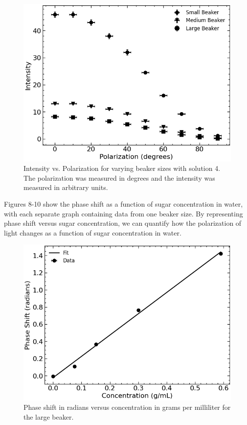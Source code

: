 \begin{figure}[H]
    \begin{center}
        \includegraphics[width=\columnwidth]{../figures/solution4.png}
    \end{center}
    \caption{Intensity vs. Polarization for varying beaker sizes with solution 4. The polarization was measured in degrees and the intensity was measured in arbitrary units.}
    \label{fig:solution4}
\end{figure}

Figures 8-10 show the phase shift as a function of sugar concentration in water, with each separate graph containing data from one beaker size. By representing phase shift versus sugar concentration, we can quantify how the polarization of light changes as a function of sugar concentration in water.

\begin{figure}[H]
    \begin{center}
        \includegraphics[width=\columnwidth]{../figures/large_beaker_phase_shifts.png}
    \end{center}
    \caption{Phase shift in radians versus concentration in grams per milliliter for the large beaker.}
    \label{fig:large_beaker_phase_shifts}
\end{figure}

